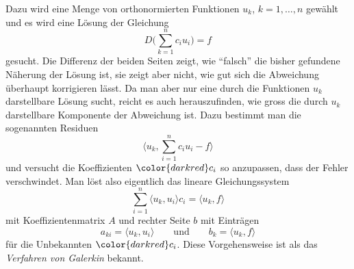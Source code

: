 Dazu wird eine Menge von orthonormierten Funktionen $u_k$,
$k=1,\dots,n$ gewählt und es wird eine Lösung der Gleichung
\[
D\biggl(\sum_{k=1}^n c_i u_i\biggr) = f
\]
gesucht.
Die Differenz der beiden Seiten zeigt, wie ``falsch'' die bisher
gefundene Näherung der Lösung ist, sie zeigt aber nicht, wie gut
sich die Abweichung überhaupt korrigieren lässt.
Da man aber nur eine durch die Funktionen $u_k$ darstellbare
Lösung sucht, reicht es auch herauszufinden, wie gross die durch
$u_k$ darstellbare Komponente der Abweichung ist.
Dazu bestimmt man die sogenannten Residuen
\[
\biggl\langle
u_k,
\sum_{i=1}^n c_iu_i
-f
\biggr\rangle
\]
und versucht die Koeffizienten ${\color{darkred}c_i}$ so anzupassen,
dass der Fehler verschwindet.
Man löst also eigentlich das lineare Gleichungssystem
\[
\sum_{i=1}^n
\langle u_k,u_i\rangle
c_i
=
\langle u_k,f\rangle
\]
mit Koeffizientenmatrix $A$ und rechter Seite $b$ mit Einträgen
\[
a_{ki}
=
\langle u_k,u_i\rangle
\qquad\text{und}\qquad
b_k
=
\langle u_k,f\rangle
\]
für die Unbekannten ${\color{darkred}c_i}$.
Diese Vorgehensweise ist als das {\em Verfahren von Galerkin} bekannt.
%
%
